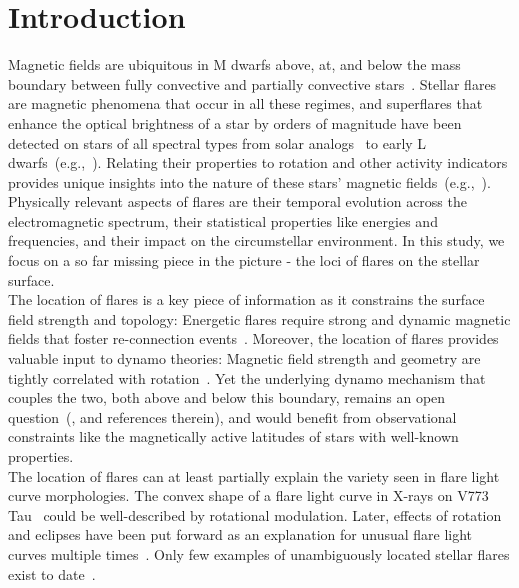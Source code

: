\documentclass[fleqn,usenatbib,letters]{mnras}%
\begin{document}
\section{Introduction}
Magnetic fields are ubiquitous in M dwarfs above, at, and below the mass boundary \citep[$0.35M_\odot$;][]{chabrier1997} between fully convective and partially convective stars~\citep{morin2010, mclean2012}. Stellar flares are magnetic phenomena that occur in all these regimes, and superflares that enhance the optical brightness of a star by orders of magnitude have been detected on stars of all spectral types from solar analogs~\citep{maehara2012} to early L dwarfs~(e.g.,~\citealt{gizis2013}). Relating their properties to rotation and other activity indicators provides unique insights into the nature of these stars' magnetic fields~(e.g.,~\citealt{stelzer2016, paudel2018}).
\\
Physically relevant aspects of flares are their temporal evolution across the electromagnetic spectrum, their statistical properties like energies and frequencies, and their impact on the circumstellar environment. In this study, we focus on a so far missing piece in the picture - the loci of flares on the stellar surface. %
\\
The location of flares is a key piece of information as it constrains the surface field strength and topology: Energetic flares require strong and dynamic magnetic fields that foster re-connection events~\citep{priest2002}. Moreover, the location of flares provides valuable input to dynamo theories: Magnetic field strength and geometry are tightly correlated with rotation~\citep{morin2008, morin2010, vidotto2014, see2019}. Yet the underlying dynamo mechanism that couples the two, both above and below this boundary, remains an open question~(\citealt{wright2018}, and references therein), and would benefit from observational constraints like the magnetically active latitudes of stars with well-known properties.
\\
The location of flares can at least partially explain the variety seen in flare light curve morphologies. The convex shape of a flare light curve in X-rays on V773 Tau~\citep{skinner1997} could be well-described by rotational modulation. Later, effects of rotation and eclipses have been put forward as an explanation for unusual flare light curves multiple times~\citep{stelzer1999,montmerle2000,johnstone2012}. Only few examples of unambiguously located stellar flares exist to date~\citep{wolter2008, peterson2010}.
\end{document}
